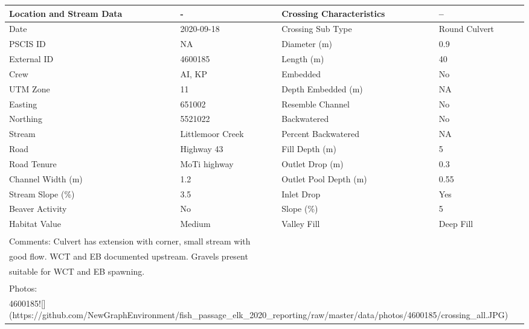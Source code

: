 \documentclass[
]{book}
\begin{document}
\begin{tabular}{l|l|l|l}
\hline
Location and Stream Data & - & Crossing Characteristics & --\\
\hline
Date & 2020-09-18 & Crossing Sub Type & Round Culvert\\
\hline
PSCIS ID & NA & Diameter (m) & 0.9\\
\hline
External ID & 4600185 & Length (m) & 40\\
\hline
Crew & AI, KP & Embedded & No\\
\hline
UTM Zone & 11 & Depth Embedded (m) & NA\\
\hline
Easting & 651002 & Resemble Channel & No\\
\hline
Northing & 5521022 & Backwatered & No\\
\hline
Stream & Littlemoor Creek & Percent Backwatered & NA\\
\hline
Road & Highway 43 & Fill Depth (m) & 5\\
\hline
Road Tenure & MoTi highway & Outlet Drop (m) & 0.3\\
\hline
Channel Width (m) & 1.2 & Outlet Pool Depth (m) & 0.55\\
\hline
Stream Slope (\%) & 3.5 & Inlet Drop & Yes\\
\hline
Beaver Activity & No & Slope (\%) & 5\\
\hline
Habitat Value & Medium & Valley Fill & Deep Fill\\
\hline
\multicolumn{4}{l}{\textsuperscript{} Comments: Culvert has extension with corner, small stream with}\\
\multicolumn{4}{l}{good flow. WCT and EB documented upstream. Gravels present}\\
\multicolumn{4}{l}{suitable for WCT and EB spawning.}\\
\multicolumn{4}{l}{\textsuperscript{} Photos:}\\
\multicolumn{4}{l}{4600185![](https://github.com/NewGraphEnvironment/fish\_passage\_elk\_2020\_reporting/raw/master/data/photos/4600185/crossing\_all.JPG)}\\
\end{tabular}
\end{document}
